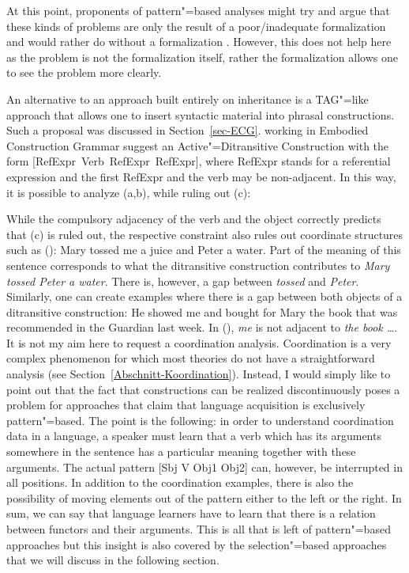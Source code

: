 At this point, proponents of pattern"=based analyses might try and argue that these kinds of problems are only
the result of a poor/inadequate formalization and would rather do without a formalization
\citep[Section~5]{Goldberg2009a}. However, this does not help here as the problem is not the formalization itself, rather
the formalization allows one to see the problem more clearly.

\begin{sloppypar}
An alternative to an approach built entirely on inheritance is a TAG"=like approach that allows one to insert syntactic material
into phrasal constructions. Such a proposal was discussed in Section~\ref{sec-ECG}. \citet[]{BC2005a} working in Embodied
Construction Grammar suggest an Active"=Ditransitive Construction with the form \mbox{[RefExpr Verb
RefExpr RefExpr]}, where RefExpr stands for a referential expression and the first RefExpr and the
verb may be non-adjacent. In this way, it is possible to analyze (a,b), while ruling out
(c):
\end{sloppypar}
\eal
{}
\zl
While the compulsory adjacency of the verb and the object correctly predicts that (c) is
ruled out, the respective constraint also rules out coordinate structures such as ():
\ea
Mary tossed me a juice and Peter a water.
\z
Part of the meaning of this sentence corresponds to what the ditransitive construction contributes to
\emph{Mary tossed Peter a water}. There is, however, a gap between \emph{tossed} and \emph{Peter}.
Similarly, one can create examples where there is a gap between both objects of a ditransitive construction:
\ea
He showed me and bought for Mary the book that was recommended in the Guardian last week.
\z
In (), \emph{me} is not adjacent to \emph{the book \ldots}. It is not my aim here to request a coordination
analysis. Coordination is a very complex phenomenon for which most theories do not have a straightforward analysis (see Section~\ref{Abschnitt-Koordination}).
Instead, I would simply like to point out that the fact that constructions can be realized discontinuously poses a problem for approaches that claim that language acquisition is exclusively
pattern"=based. The point is the following: in order to understand coordination data in a language, a speaker must learn that a verb which has its arguments somewhere in the sentence has
a particular meaning together with these arguments. The actual pattern [Sbj V Obj1 Obj2] can, however, be interrupted in all positions.
In addition to the coordination examples, there is also the possibility of moving elements out of the pattern either to the left or the right.
In sum, we can say that language learners have to learn that there is a relation between functors and their arguments. This is all that is left of
pattern"=based approaches but this insight is also covered by the selection"=based approaches that we will discuss in the following section.

